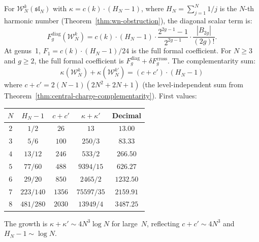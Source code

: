 \begin{computation}\label{comp:wn-genus-expansion}

For $\mathcal{W}_N^k(\mathfrak{sl}_N)$ with
$\kappa = c(k) \cdot (H_N - 1)$, where
$H_N = \sum_{j=1}^N 1/j$ is the $N$-th harmonic number
(Theorem~\ref{thm:wn-obstruction}), the diagonal scalar term is:
\begin{equation}\label{eq:wn-Fg}
F_g^{\mathrm{diag}}(\mathcal{W}_N^k)
= c(k) \cdot (H_N - 1) \cdot
\frac{2^{2g-1}-1}{2^{2g-1}} \cdot \frac{|B_{2g}|}{(2g)!}.
\end{equation}
At genus~1, $F_1 = c(k) \cdot (H_N - 1)/24$ is the full
formal coefficient. For $N\geq 3$ and $g\geq2$, the full formal coefficient is
$F_g^{\mathrm{diag}}+\delta F_g^{\mathrm{cross}}$.
The complementarity sum:
\[
\kappa(\mathcal{W}_N^k) + \kappa(\mathcal{W}_N^{k'}) = (c + c') \cdot (H_N - 1)
\]
where $c + c' = 2(N-1)(2N^2+2N+1)$ (the level-independent sum from Theorem~\ref{thm:central-charge-complementarity}). First values:
\begin{center}
\renewcommand{\arraystretch}{1.3}
\begin{tabular}{ccccc}
\toprule
$N$ & $H_N - 1$ & $c + c'$ & $\kappa + \kappa'$ & Decimal \\
\midrule
$2$ & $1/2$ & $26$ & $13$ & $13.00$ \\
$3$ & $5/6$ & $100$ & $250/3$ & $83.33$ \\
$4$ & $13/12$ & $246$ & $533/2$ & $266.50$ \\
$5$ & $77/60$ & $488$ & $9394/15$ & $626.27$ \\
$6$ & $29/20$ & $850$ & $2465/2$ & $1232.50$ \\
$7$ & $223/140$ & $1356$ & $75597/35$ & $2159.91$ \\
$8$ & $481/280$ & $2030$ & $13949/4$ & $3487.25$ \\
\bottomrule
\end{tabular}
\end{center}
The growth is $\kappa + \kappa' \sim 4N^3 \log N$ for large~$N$, reflecting $c + c' \sim 4N^3$ and $H_N - 1 \sim \log N$.
\end{computation}

